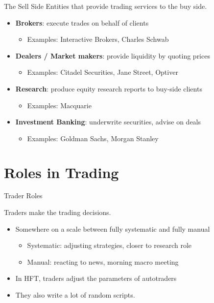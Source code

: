 \begin{frame}{The Sell Side}
  Entities that provide trading services to the buy side.

  \vspace{0.3cm}
  \begin{itemize}
    \item \textbf{Brokers}: execute trades on behalf of clients
    \begin{itemize}
      \item Examples: Interactive Brokers, Charles Schwab
    \end{itemize}
    \item \textbf{Dealers / Market makers}: provide liquidity by quoting prices
    \begin{itemize}
      \item Examples: Citadel Securities, Jane Street, Optiver
    \end{itemize}
    \item \textbf{Research}: produce equity research reports to buy-side clients
    \begin{itemize}
      \item Examples: Macquarie
    \end{itemize}
    \item \textbf{Investment Banking}: underwrite securities, advise on deals
    \begin{itemize}
      \item Examples: Goldman Sachs, Morgan Stanley
    \end{itemize}
  \end{itemize}
\end{frame}


\section{Roles in Trading}

\begin{frame}{Trader Roles}
  \begin{sqt:definition}
    Traders make the trading decisions.
  \end{sqt:definition}
  
  \begin{itemize}
    \item Somewhere on a scale between fully systematic and fully manual
    \begin{itemize}
      \item Systematic: adjusting strategies, closer to research role
      \item Manual: reacting to news, morning macro meeting
    \end{itemize}

    \item In HFT, traders adjust the parameters of autotraders
    \item They also write a lot of random scripts.
  \end{itemize}
\end{frame}

